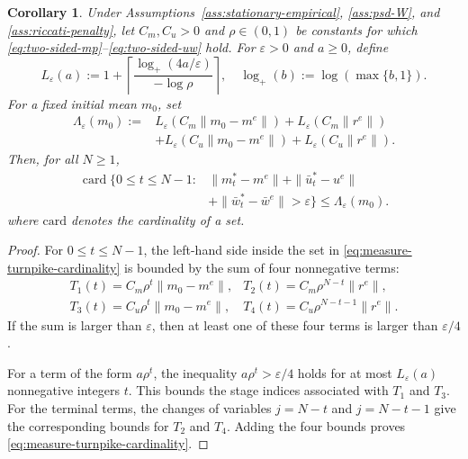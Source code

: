 \documentclass[10pt,journal,twoside]{IEEEtran}
\newtheorem{corollary}{Corollary}
\theoremstyle{definition}
\theoremstyle{remark}
\begin{document}
\begin{corollary}
	\label{cor:measure-turnpike-affine}
	{Under Assumptions~\ref{ass:stationary-empirical},
	\ref{ass:psd-W}, 
	and \ref{ass:riccati-penalty},} {let \(C_m,C_u>0\) and \(\rho\in(0,1)\)
			be constants for which \eqref{eq:two-sided-mp}--\eqref{eq:two-sided-uw}
			hold.} For \(\varepsilon>0\) and \(a\ge0\), define
	\begin{equation*}
		L_\varepsilon(a)
		:=
		1+
		\left\lceil
		\frac{\log_+(4a/\varepsilon)}{-\log\rho}
		\right\rceil,
		\quad
		\log_+(b):=\log(\max\{b,1\}).
	\end{equation*}
	For a fixed initial mean \(m_0\), set
	\begin{equation*}
		\begin{aligned}
			\Lambda_\varepsilon(m_0)
			:={}&
			L_\varepsilon(C_m\|m_0-m^e\|)
			+
			L_\varepsilon(C_m\|r^e\|)       \\
			&+
			L_\varepsilon(C_u\|m_0-m^e\|)
			+
			L_\varepsilon(C_u\|r^e\|).
		\end{aligned}
	\end{equation*}
	Then, for all \(N\ge 1\),
	\begin{equation}
		\begin{aligned}
			\operatorname{card}\Big\{0\le t\le N-1:
			&\|m_t^*-m^e\|
			+\|\bar{u}_t^*-u^e\|        \\
			&+\|\bar{w}_t^*-\bar w^e\|
			>\varepsilon
			\Big\}
			\le
			\Lambda_\varepsilon(m_0).
		\end{aligned}
		\label{eq:measure-turnpike-cardinality}
	\end{equation}
    where $\mathrm{card}$ denotes the cardinality of a set. 
\end{corollary} 

\begin{proof}
	For \(0\le t\le N-1\), the left-hand side inside the set in	\eqref{eq:measure-turnpike-cardinality} is bounded by the sum of four
	nonnegative terms:
	\[
	\begin{array}{ll}
		T_1(t)=C_m\rho^t\|m_0-m^e\|,
		&
		T_2(t)=C_m\rho^{N-t}\|r^e\|,\\[1mm]
		T_3(t)=C_u\rho^t\|m_0-m^e\|,
		&
		T_4(t)=C_u\rho^{N-t-1}\|r^e\|.
	\end{array}
	\]
	If the sum is larger than \(\varepsilon\), then at least one of these four
	terms is larger than \(\varepsilon/4\).
	
	For a term of the form \(a\rho^t\), the inequality
	\(a\rho^t>\varepsilon/4\) holds for at most \(L_\varepsilon(a)\)
	nonnegative integers \(t\). This bounds the stage indices associated with
	\(T_1\) and \(T_3\). For the terminal terms, the changes of variables
	\(j=N-t\) and \(j=N-t-1\) give the corresponding bounds for \(T_2\) and
	\(T_4\). Adding the four bounds proves
	\eqref{eq:measure-turnpike-cardinality}.
\end{proof}
\end{document}
